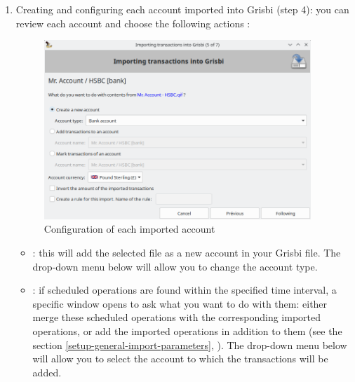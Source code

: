 \begin{enumerate}
	\item Creating and configuring each account imported into Grisbi (step 4): you can review each account and choose the following actions :
	\begin{figure}[htbp]
		\begin{center}
		\includegraphics[width=0.95\textwidth]{image/screenshot/importexport_import_files_setup}
		\end{center}
		\caption{Configuration of each imported account}%
		\label{importexport-import-files-setup-img}
	\end{figure}
		\begin{itemize}
			\item {}:%
			this will add the selected file as a new account in your Grisbi file. The drop-down menu  below will allow you to change the account type.
			\item {}:%
			if scheduled operations are found within the specified time interval, a specific window opens to ask what you want to do with them: either merge these scheduled operations with the corresponding imported operations, or add the imported operations in addition to them (see the section \vref{setup-general-import-parameters}, ). The  drop-down menu below will allow you to select the account to which the transactions will be added.

\end{itemize}
\end{enumerate}
